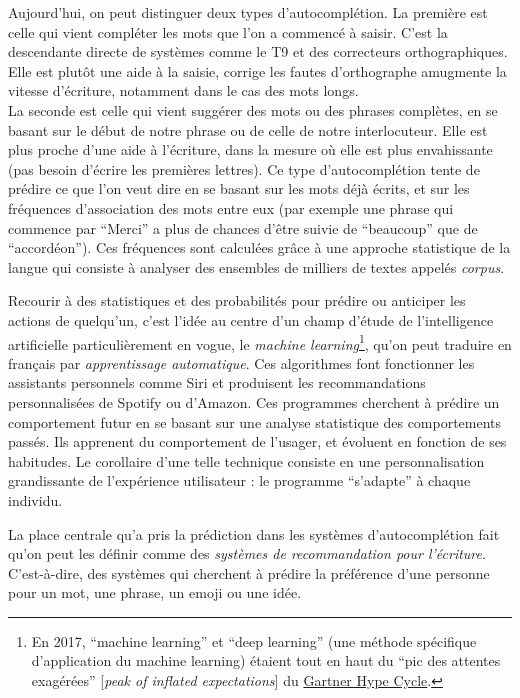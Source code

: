 \documentclass[]{article}
\begin{document}
Aujourd'hui, on peut distinguer deux types d'autocomplétion. La première
est celle qui vient compléter les mots que l'on a commencé à saisir.
C'est la descendante directe de systèmes comme le T9 et des correcteurs
orthographiques. Elle est plutôt une aide à la saisie, corrige les
fautes d'orthographe amugmente la vitesse d'écriture, notamment dans le
cas des mots longs.\\
La seconde est celle qui vient suggérer des mots ou des phrases
complètes, en se basant sur le début de notre phrase ou de celle de
notre interlocuteur. Elle est plus proche d'une aide à l'écriture, dans
la mesure où elle est plus envahissante (pas besoin d'écrire les
premières lettres). Ce type d'autocomplétion tente de prédire ce que
l'on veut dire en se basant sur les mots déjà écrits, et sur les
fréquences d'association des mots entre eux (par exemple une phrase qui
commence par ``Merci'' a plus de chances d'être suivie de ``beaucoup''
que de ``accordéon''). Ces fréquences sont calculées grâce à une
approche statistique de la langue qui consiste à analyser des ensembles
de milliers de textes appelés \emph{corpus}.

Recourir à des statistiques et des probabilités pour prédire ou
anticiper les actions de quelqu'un, c'est l'idée au centre d'un champ
d'étude de l'intelligence artificielle particulièrement en vogue, le
\emph{machine learning}\footnote{En 2017, ``machine learning'' et ``deep
  learning'' (une méthode spécifique d'application du machine learning)
  étaient tout en haut du ``pic des attentes exagérées'' {[}\emph{peak
  of inflated expectations}{]} du
  \href{https://blogs.gartner.com/smarterwithgartner/files/2017/08/Emerging-Technology-Hype-Cycle-for-2017_Infographic_R6A.jpg}{Gartner
  Hype Cycle}.}, qu'on peut traduire en français par \emph{apprentissage
automatique}. Ces algorithmes font fonctionner les assistants personnels
comme Siri et produisent les recommandations personnalisées de Spotify
ou d'Amazon. Ces programmes cherchent à prédire un comportement futur en
se basant sur une analyse statistique des comportements passés. Ils
apprenent du comportement de l'usager, et évoluent en fonction de ses
habitudes. Le corollaire d'une telle technique consiste en une
personnalisation grandissante de l'expérience utilisateur : le programme
``s'adapte'' à chaque individu.

La place centrale qu'a pris la prédiction dans les systèmes
d'autocomplétion fait qu'on peut les définir comme des \emph{systèmes de
recommandation pour l'écriture}. C'est-à-dire, des systèmes qui
cherchent à prédire la préférence d'une personne pour un mot, une
phrase, un emoji ou une idée.
\end{document}
